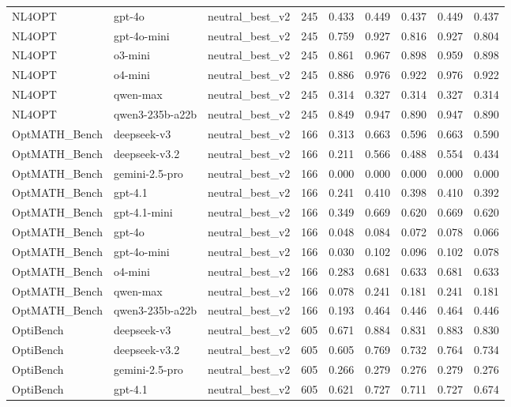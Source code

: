 \begin{table}[t]
\begin{tabular}{lllllllll}
NL4OPT & gpt-4o & neutral\_best\_v2 & 245 & 0.433 & 0.449 & 0.437 & 0.449 & 0.437 \\
NL4OPT & gpt-4o-mini & neutral\_best\_v2 & 245 & 0.759 & 0.927 & 0.816 & 0.927 & 0.804 \\
NL4OPT & o3-mini & neutral\_best\_v2 & 245 & 0.861 & 0.967 & 0.898 & 0.959 & 0.898 \\
NL4OPT & o4-mini & neutral\_best\_v2 & 245 & 0.886 & 0.976 & 0.922 & 0.976 & 0.922 \\
NL4OPT & qwen-max & neutral\_best\_v2 & 245 & 0.314 & 0.327 & 0.314 & 0.327 & 0.314 \\
NL4OPT & qwen3-235b-a22b & neutral\_best\_v2 & 245 & 0.849 & 0.947 & 0.890 & 0.947 & 0.890 \\
OptMATH\_Bench & deepseek-v3 & neutral\_best\_v2 & 166 & 0.313 & 0.663 & 0.596 & 0.663 & 0.590 \\
OptMATH\_Bench & deepseek-v3.2 & neutral\_best\_v2 & 166 & 0.211 & 0.566 & 0.488 & 0.554 & 0.434 \\
OptMATH\_Bench & gemini-2.5-pro & neutral\_best\_v2 & 166 & 0.000 & 0.000 & 0.000 & 0.000 & 0.000 \\
OptMATH\_Bench & gpt-4.1 & neutral\_best\_v2 & 166 & 0.241 & 0.410 & 0.398 & 0.410 & 0.392 \\
OptMATH\_Bench & gpt-4.1-mini & neutral\_best\_v2 & 166 & 0.349 & 0.669 & 0.620 & 0.669 & 0.620 \\
OptMATH\_Bench & gpt-4o & neutral\_best\_v2 & 166 & 0.048 & 0.084 & 0.072 & 0.078 & 0.066 \\
OptMATH\_Bench & gpt-4o-mini & neutral\_best\_v2 & 166 & 0.030 & 0.102 & 0.096 & 0.102 & 0.078 \\
OptMATH\_Bench & o4-mini & neutral\_best\_v2 & 166 & 0.283 & 0.681 & 0.633 & 0.681 & 0.633 \\
OptMATH\_Bench & qwen-max & neutral\_best\_v2 & 166 & 0.078 & 0.241 & 0.181 & 0.241 & 0.181 \\
OptMATH\_Bench & qwen3-235b-a22b & neutral\_best\_v2 & 166 & 0.193 & 0.464 & 0.446 & 0.464 & 0.446 \\
OptiBench & deepseek-v3 & neutral\_best\_v2 & 605 & 0.671 & 0.884 & 0.831 & 0.883 & 0.830 \\
OptiBench & deepseek-v3.2 & neutral\_best\_v2 & 605 & 0.605 & 0.769 & 0.732 & 0.764 & 0.734 \\
OptiBench & gemini-2.5-pro & neutral\_best\_v2 & 605 & 0.266 & 0.279 & 0.276 & 0.279 & 0.276 \\
OptiBench & gpt-4.1 & neutral\_best\_v2 & 605 & 0.621 & 0.727 & 0.711 & 0.727 & 0.674 \\

\end{tabular}
\end{table}
